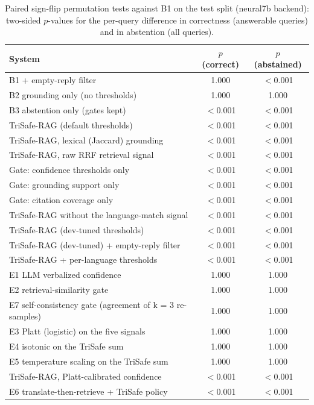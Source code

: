 \begin{table}[t]
  \caption{Paired sign-flip permutation tests against B1 on the test split (neural7b backend): two-sided $p$-values for the per-query difference in correctness (answerable queries) and in abstention (all queries).}
  \label{tab:tests-neural7b}
  \footnotesize
  \begin{tabular}{lcc}
    \toprule
    System & $p$ (correct) & $p$ (abstained) \\
    \midrule
    B1 + empty-reply filter & 1.000 & $<$0.001 \\
    B2 grounding only (no thresholds) & 1.000 & 1.000 \\
    B3 abstention only (gates kept) & $<$0.001 & $<$0.001 \\
    TriSafe-RAG (default thresholds) & $<$0.001 & $<$0.001 \\
    TriSafe-RAG, lexical (Jaccard) grounding & $<$0.001 & $<$0.001 \\
    TriSafe-RAG, raw RRF retrieval signal & $<$0.001 & $<$0.001 \\
    Gate: confidence thresholds only & $<$0.001 & $<$0.001 \\
    Gate: grounding support only & $<$0.001 & $<$0.001 \\
    Gate: citation coverage only & $<$0.001 & $<$0.001 \\
    TriSafe-RAG without the language-match signal & $<$0.001 & $<$0.001 \\
    TriSafe-RAG (dev-tuned thresholds) & $<$0.001 & $<$0.001 \\
    TriSafe-RAG (dev-tuned) + empty-reply filter & $<$0.001 & $<$0.001 \\
    TriSafe-RAG + per-language thresholds & $<$0.001 & $<$0.001 \\
    E1 LLM verbalized confidence & 1.000 & 1.000 \\
    E2 retrieval-similarity gate & 1.000 & 1.000 \\
    E7 self-consistency gate (agreement of k = 3 re-samples) & 1.000 & 1.000 \\
    E3 Platt (logistic) on the five signals & 1.000 & 1.000 \\
    E4 isotonic on the TriSafe sum & 1.000 & 1.000 \\
    E5 temperature scaling on the TriSafe sum & 1.000 & 1.000 \\
    TriSafe-RAG, Platt-calibrated confidence & $<$0.001 & $<$0.001 \\
    E6 translate-then-retrieve + TriSafe policy & $<$0.001 & $<$0.001 \\
    \bottomrule
  \end{tabular}
\end{table}
